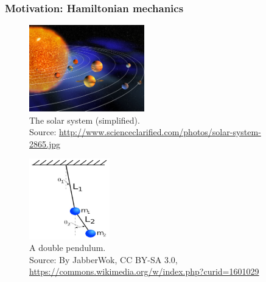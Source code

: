 \begin{frame}
  \frametitle{Motivation: Hamiltonian mechanics}
  \pause
  \begin{minipage}{0.45\textwidth}
    \begin{figure}
      \includegraphics[width=5cm]{images/solar_system.jpg}\\
      The solar system (simplified).\\[0.5\baselineskip]
      \tiny{Source: \url{http://www.scienceclarified.com/photos/solar-system-2865.jpg}}
    \end{figure}
  \end{minipage}
  \hspace{1cm}
  \begin{minipage}{0.4\textwidth}
    \begin{figure}
      \includegraphics[height=3.5cm]{images/double_pendulum.jpg}\\[0.3\baselineskip]
      A double pendulum.\\[1\baselineskip]
      \tiny{Source: By JabberWok, CC BY-SA 3.0, \url{https://commons.wikimedia.org/w/index.php?curid=1601029}}
    \end{figure}
  \end{minipage}
\end{frame}

